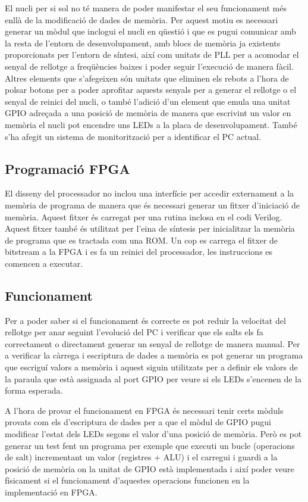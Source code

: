 \documentclass[10pt,a4paper,twocolumn,twoside]{article}
\begin{document}
    El nucli per si sol no té manera de poder manifestar el seu funcionament més enllà de la modificació de dades de memòria. Per aquest motiu es necessari generar un mòdul que inclogui el nucli en qüestió i que es pugui comunicar amb la resta de l'entorn de desenvolupament, amb blocs de memòria ja existents proporcionats per l'entorn de síntesi, així com unitats de PLL per a acomodar el senyal de rellotge a freqüències baixes i poder seguir l'execució de manera fàcil. Altres elements que s'afegeixen són unitats que eliminen els rebots a l'hora de polsar botons per a poder aprofitar aquests senyals per a generar el rellotge o el senyal de reinici del nucli, o també l'adició d'un element que emula una unitat GPIO adreçada a una posició de memòria de manera que escrivint un valor en memòria el nucli pot encendre uns LEDs a la placa de desenvolupament. També s'ha afegit un sistema de monitorització per a identificar el PC actual.
    
    \subsection{Programació FPGA}
    El disseny del processador no inclou una interfície per accedir externament a la memòria de programa de manera que és necessari generar un fitxer d'iniciació de memòria. Aquest fitxer és carregat per una rutina inclosa en el codi Verilog. Aquest fitxer també és utilitzat per l’eina de síntesis per inicialitzar la memòria de programa que es tractada com una ROM. Un cop es carrega el fitxer de bitstream a la FPGA i es fa un reinici del processador, les instruccions es comencen a executar. 
    \subsection{Funcionament}
    
    Per a poder saber si el funcionament és correcte es pot reduir la velocitat del rellotge per anar seguint l'evolució del PC i verificar que els salts els fa correctament o directament generar un senyal de rellotge de manera manual.
    Per a verificar la càrrega i escriptura de dades a memòria es pot generar un programa que escriguí valors a memòria i aquest siguin utilitzats per a definir els valors de la paraula que està assignada al port GPIO per veure si els LEDs s'encenen de la forma esperada.
    
    A l'hora de provar el funcionament en FPGA és necessari tenir certs mòduls provats com els d'escriptura de dades per a que el mòdul de GPIO pugui modificar l'estat dels LEDs segons el valor d'una posició de memòria. Però es pot generar un test fent un programa per exemple que executi un bucle (operacions de salt) incrementant un valor (registres + ALU) i el carregui i guardi a la posició de memòria on la unitat de GPIO està implementada i així poder veure físicament si el funcionament d'aquestes operacions funcionen en la implementació en FPGA. 
\end{document}
